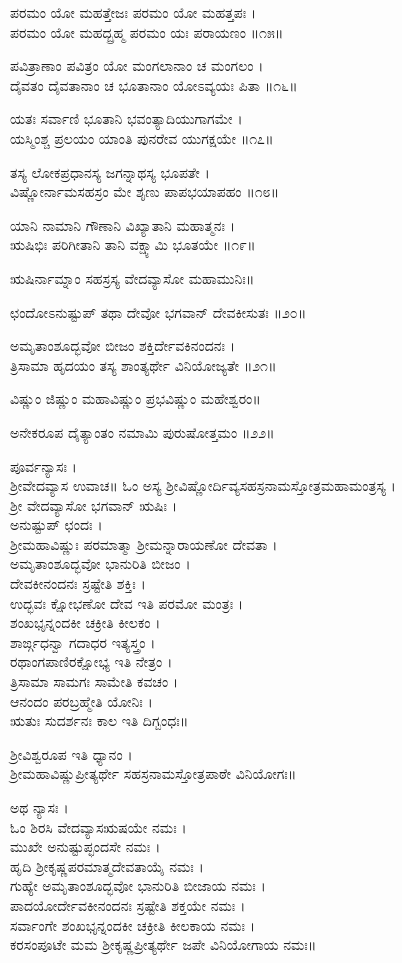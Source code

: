 ಪರಮಂ ಯೋ ಮಹತ್ತೇಜಃ ಪರಮಂ ಯೋ ಮಹತ್ತಪಃ ।\\
ಪರಮಂ ಯೋ ಮಹದ್ಬ್ರಹ್ಮ ಪರಮಂ ಯಃ ಪರಾಯಣಂ ॥೧೫॥

ಪವಿತ್ರಾಣಾಂ ಪವಿತ್ರಂ ಯೋ ಮಂಗಲಾನಾಂ ಚ ಮಂಗಲಂ ।\\
ದೈವತಂ ದೈವತಾನಾಂ ಚ ಭೂತಾನಾಂ ಯೋಽವ್ಯಯಃ ಪಿತಾ ॥೧೬॥

ಯತಃ ಸರ್ವಾಣಿ ಭೂತಾನಿ ಭವಂತ್ಯಾದಿಯುಗಾಗಮೇ ।\\
ಯಸ್ಮಿಂಶ್ಚ ಪ್ರಲಯಂ ಯಾಂತಿ ಪುನರೇವ ಯುಗಕ್ಷಯೇ ॥೧೭॥

ತಸ್ಯ ಲೋಕಪ್ರಧಾನಸ್ಯ ಜಗನ್ನಾಥಸ್ಯ ಭೂಪತೇ ।\\
ವಿಷ್ಣೋರ್ನಾಮಸಹಸ್ರಂ ಮೇ ಶೃಣು ಪಾಪಭಯಾಪಹಂ ॥೧೮॥

ಯಾನಿ ನಾಮಾನಿ ಗೌಣಾನಿ ವಿಖ್ಯಾತಾನಿ ಮಹಾತ್ಮನಃ ।\\
ಋಷಿಭಿಃ ಪರಿಗೀತಾನಿ ತಾನಿ ವಕ್ಷ್ಯಾಮಿ ಭೂತಯೇ ॥೧೯॥

ಋಷಿರ್ನಾಮ್ನಾಂ ಸಹಸ್ರಸ್ಯ ವೇದವ್ಯಾಸೋ ಮಹಾಮುನಿಃ॥

ಛಂದೋಽನುಷ್ಟುಪ್ ತಥಾ ದೇವೋ ಭಗವಾನ್ ದೇವಕೀಸುತಃ ॥೨೦॥

ಅಮೃತಾಂಶೂದ್ಭವೋ ಬೀಜಂ ಶಕ್ತಿರ್ದೇವಕಿನಂದನಃ ।\\
ತ್ರಿಸಾಮಾ ಹೃದಯಂ ತಸ್ಯ ಶಾಂತ್ಯರ್ಥೇ ವಿನಿಯೋಜ್ಯತೇ ॥೨೧॥

ವಿಷ್ಣುಂ ಜಿಷ್ಣುಂ ಮಹಾವಿಷ್ಣುಂ ಪ್ರಭವಿಷ್ಣುಂ ಮಹೇಶ್ವರಂ॥

ಅನೇಕರೂಪ ದೈತ್ಯಾಂತಂ ನಮಾಮಿ ಪುರುಷೋತ್ತಮಂ ॥೨೨॥

ಪೂರ್ವನ್ಯಾಸಃ ।\\
ಶ್ರೀವೇದವ್ಯಾಸ ಉವಾಚ॥
ಓಂ ಅಸ್ಯ ಶ್ರೀವಿಷ್ಣೋರ್ದಿವ್ಯಸಹಸ್ರನಾಮಸ್ತೋತ್ರಮಹಾಮಂತ್ರಸ್ಯ ।\\
ಶ್ರೀ ವೇದವ್ಯಾಸೋ ಭಗವಾನ್ ಋಷಿಃ ।\\
ಅನುಷ್ಟುಪ್ ಛಂದಃ ।\\
ಶ್ರೀಮಹಾವಿಷ್ಣುಃ ಪರಮಾತ್ಮಾ ಶ್ರೀಮನ್ನಾರಾಯಣೋ ದೇವತಾ ।\\
ಅಮೃತಾಂಶೂದ್ಭವೋ ಭಾನುರಿತಿ ಬೀಜಂ ।\\
ದೇವಕೀನಂದನಃ ಸ್ರಷ್ಟೇತಿ ಶಕ್ತಿಃ ।\\
ಉದ್ಭವಃ ಕ್ಷೋಭಣೋ ದೇವ ಇತಿ ಪರಮೋ ಮಂತ್ರಃ ।\\
ಶಂಖಭೃನ್ನಂದಕೀ ಚಕ್ರೀತಿ ಕೀಲಕಂ ।\\
ಶಾರ್ಙ್ಗಧನ್ವಾ ಗದಾಧರ ಇತ್ಯಸ್ತ್ರಂ ।\\
ರಥಾಂಗಪಾಣಿರಕ್ಷೋಭ್ಯ ಇತಿ ನೇತ್ರಂ ।\\
ತ್ರಿಸಾಮಾ ಸಾಮಗಃ ಸಾಮೇತಿ ಕವಚಂ ।\\
ಆನಂದಂ ಪರಬ್ರಹ್ಮೇತಿ ಯೋನಿಃ ।\\
ಋತುಃ ಸುದರ್ಶನಃ ಕಾಲ ಇತಿ ದಿಗ್ಬಂಧಃ॥

ಶ್ರೀವಿಶ್ವರೂಪ ಇತಿ ಧ್ಯಾನಂ ।\\
ಶ್ರೀಮಹಾವಿಷ್ಣುಪ್ರೀತ್ಯರ್ಥೇ ಸಹಸ್ರನಾಮಸ್ತೋತ್ರಪಾಠೇ ವಿನಿಯೋಗಃ॥

ಅಥ ನ್ಯಾಸಃ ।\\
ಓಂ ಶಿರಸಿ ವೇದವ್ಯಾಸಋಷಯೇ ನಮಃ ।\\
ಮುಖೇ ಅನುಷ್ಟುಪ್ಛಂದಸೇ ನಮಃ ।\\
ಹೃದಿ ಶ್ರೀಕೃಷ್ಣಪರಮಾತ್ಮದೇವತಾಯೈ ನಮಃ ।\\
ಗುಹ್ಯೇ ಅಮೃತಾಂಶೂದ್ಭವೋ ಭಾನುರಿತಿ ಬೀಜಾಯ ನಮಃ ।\\
ಪಾದಯೋರ್ದೇವಕೀನಂದನಃ ಸ್ರಷ್ಟೇತಿ ಶಕ್ತಯೇ ನಮಃ ।\\
ಸರ್ವಾಂಗೇ ಶಂಖಭೃನ್ನಂದಕೀ ಚಕ್ರೀತಿ ಕೀಲಕಾಯ ನಮಃ ।\\
ಕರಸಂಪೂಟೇ ಮಮ ಶ್ರೀಕೃಷ್ಣಪ್ರೀತ್ಯರ್ಥೇ ಜಪೇ ವಿನಿಯೋಗಾಯ ನಮಃ॥

